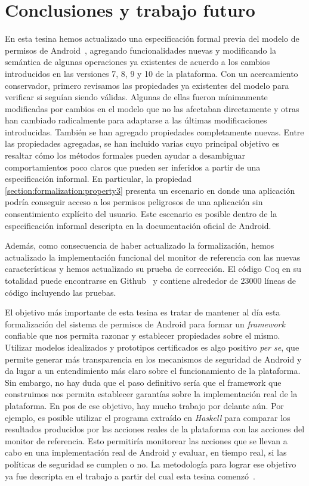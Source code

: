 \chapter{Conclusiones y trabajo futuro}
\label{chapter:conclusion}

En esta tesina hemos actualizado una especificación formal previa del modelo de permisos de
Android~\cite{luna-cleiej,betarte-2016}, agregando funcionalidades nuevas y modificando la semántica
de algunas operaciones ya existentes de acuerdo a los cambios introducidos en las versiones 7, 8, 9
y 10 de la plataforma. Con un acercamiento conservador, primero revisamos las propiedades ya
existentes del modelo para verificar si seguían siendo válidas. Algunas de ellas fueron mínimamente
modificadas por cambios en el modelo que no las afectaban directamente y otras han cambiado
radicalmente para adaptarse a las últimas modificaciones introducidas. También se han agregado
propiedades completamente nuevas. Entre las propiedades agregadas, se han incluido varias cuyo
principal objetivo es resaltar cómo los métodos formales pueden ayudar a desambiguar comportamientos
poco claros que pueden ser inferidos a partir de una especificación informal. En particular, la
propiedad \ref{section:formalization:property3} presenta un escenario en donde una aplicación podría
conseguir acceso a los permisos peligrosos de una aplicación sin consentimiento explícito del
usuario. Este escenario es posible dentro de la especificación informal descripta en la
documentación oficial de Android.

Además, como consecuencia de haber actualizado la formalización, hemos actualizado la implementación
funcional del monitor de referencia con las nuevas características y hemos actualizado su prueba de
corrección. El código Coq en su totalidad puede encontrarse en Github~\cite{github-code} y contiene
alrededor de 23000 líneas de código incluyendo las pruebas.

El objetivo más importante de esta tesina es tratar de mantener al día esta formalización del
sistema de permisos de Android para formar un \textit{framework} confiable que nos permita razonar y
establecer propiedades sobre el mismo. Utilizar modelos idealizados y prototipos certificados es
algo positivo \textit{per se}, que permite generar más transparencia en los mecanismos de seguridad
de Android y da lugar a un entendimiento más claro sobre el funcionamiento de la plataforma. Sin
embargo, no hay duda que el paso definitivo sería que el framework que construimos nos permita
establecer garantías sobre la implementación real de la plataforma. En pos de ese objetivo, hay
mucho trabajo por delante aún. Por ejemplo, es posible utilizar el programa extraído en
\textit{Haskell} para comparar los resultados producidos por las acciones reales de la plataforma
con las acciones del monitor de referencia. Esto permitiría monitorear las acciones que se llevan a
cabo en una implementación real de Android y evaluar, en tiempo real, si las políticas de seguridad
se cumplen o no. La metodología para lograr ese objetivo ya fue descripta en el trabajo a partir del
cual esta tesina comenzó~\cite{luna-cleiej}.

